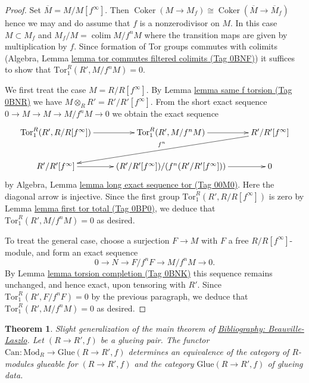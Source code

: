 \documentclass{amsart}
\newenvironment{reference}{\comment}{\endcomment}
\theoremstyle{plain}
\newtheorem{theorem}[subsection]{Theorem}
\theoremstyle{definition}
\theoremstyle{remark}
\numberwithin{equation}{subsection}
\def\colim{\mathop{\mathrm{colim}}\nolimits}
\def\Coker{\mathop{\mathrm{Coker}}}
\begin{document}
\begin{proof}
Set $\overline{M} = M/M[f^\infty]$. Then
$\Coker(M \to M_f) \cong \Coker(\overline{M} \to \overline{M}_f)$
hence we may and do assume that $f$ is a nonzerodivisor on $M$.
In this case $M \subset M_f$ and $M_f/M = \colim M/f^nM$ where the
transition maps are given by multiplication by $f$. Since
formation of Tor groups commutes with colimits
(Algebra, Lemma \href{https://stacks.math.columbia.edu/tag/0BNF}{lemma tor commutes filtered colimits (Tag 0BNF)})
it suffices to show that $\text{Tor}^R_1(R', M/f^n M) = 0$.

\medskip\noindent
We first treat the case $M = R/R[f^\infty]$. By
Lemma \href{https://stacks.math.columbia.edu/tag/0BNR}{lemma same f torsion (Tag 0BNR)}
we have $M \otimes_R R' = R'/R'[f^\infty]$.
From the short exact sequence $0 \to M \to M \to M/f^nM \to 0$
we obtain the exact sequence
$$
\xymatrix{
\text{Tor}_1^R(R', R/R[f^\infty]) \ar[r] &
\text{Tor}_1^R(R', M/f^n M) \ar[r] &
R'/R'[f^\infty] \ar[dll]_{f^n} \\
R'/R'[f^\infty] \ar[r] &
(R'/R'[f^\infty])/(f^n
(R'/R'[f^\infty])) \ar[r] & 0
}
$$
by Algebra, Lemma \href{https://stacks.math.columbia.edu/tag/00M0}{lemma long exact sequence tor (Tag 00M0)}.
Here the diagonal arrow is injective. Since the first group
$\text{Tor}_1^R(R', R/R[f^\infty])$ is zero by
Lemma \href{https://stacks.math.columbia.edu/tag/0BP0}{lemma first tor total (Tag 0BP0)}, we deduce that
$\text{Tor}_1^R(R', M/f^nM) = 0$ as desired.

\medskip\noindent
To treat the general case, choose a surjection $F \to M$ with $F$ a free
$R/R[f^\infty]$-module, and form an exact sequence
$$
0 \to N \to F/f^n F \to M/f^n M \to 0.
$$
By Lemma \href{https://stacks.math.columbia.edu/tag/0BNK}{lemma torsion completion (Tag 0BNK)}
this sequence remains unchanged, and hence
exact, upon tensoring with $R'$.
Since $\text{Tor}^R_1(R', F/f^n F) = 0$ by the
previous paragraph, we deduce  that
$\text{Tor}^R_1(R', M/f^n M) = 0$ as desired.
\end{proof}

\begin{theorem}
\label{theorem-BL-glueing}
\begin{reference}
Slight generalization of the main theorem of \href{https://stacks.math.columbia.edu/bibliography}{Bibliography: Beauville-Laszlo}.
\end{reference}
Let $(R \to R',f)$ be a glueing pair. The functor
$\text{Can} : \text{Mod}_R \longrightarrow \text{Glue}(R \to R', f)$
determines an equivalence of the category of $R$-modules glueable
for $(R \to R', f)$ and the category $\text{Glue}(R \to R', f)$
of glueing data.
\end{theorem}
\end{document}
